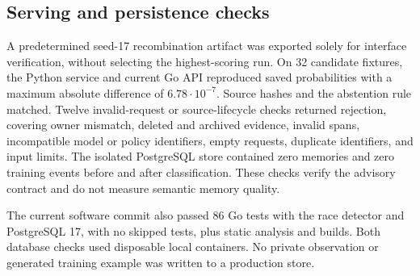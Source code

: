 \subsection{Serving and persistence checks}
A predetermined seed-17 recombination artifact was exported solely for interface verification, without selecting the highest-scoring run. On 32 candidate fixtures, the Python service and current Go API reproduced saved probabilities with a maximum absolute difference of $6.78\cdot10^{-7}$. Source hashes and the abstention rule matched. Twelve invalid-request or source-lifecycle checks returned rejection, covering owner mismatch, deleted and archived evidence, invalid spans, incompatible model or policy identifiers, empty requests, duplicate identifiers, and input limits. The isolated PostgreSQL store contained zero memories and zero training events before and after classification. These checks verify the advisory contract and do not measure semantic memory quality.

The current software commit also passed 86 Go tests with the race detector and PostgreSQL 17, with no skipped tests, plus static analysis and builds. Both database checks used disposable local containers. No private observation or generated training example was written to a production store.
